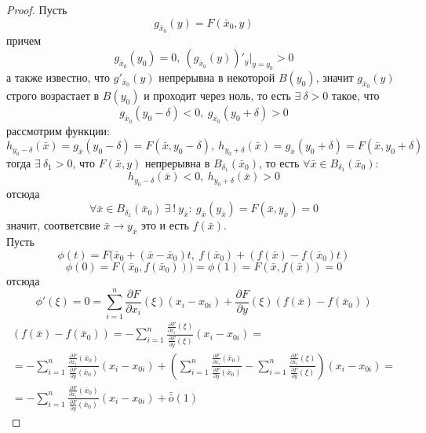 \begin{proof}
    Пусть 
    \[g_{\bar{x}_0}(y)=F(\bar{x}_0,y)\]
    причем
    \[g_{\bar{x}_0}(y_0)=0,\ (g_{\bar{x}_0}(y))'_y|_{y=y_0}>0\]
    а также известно, что $g'_{\bar{x}_0}(y)$ непрерывна в некоторой $B(y_0)$, значит $g_{\bar{x}_0}(y)$ строго возрастает в $B(y_0)$ и проходит через ноль, то есть $\exists\ \delta>0$ такое, что
    \[g_{\bar{x}_0}(y_0-\delta)<0,\ g_{\bar{x}_0}(y_0+\delta)>0\]
    рассмотрим функции:
    \[h_{y_0-\delta}(\bar{x})=g_{\bar{x}}(y_0-\delta)=F(\bar{x},y_0-\delta),\ h_{y_0+\delta}(\bar{x})=g_{\bar{x}}(y_0+\delta)=F(\bar{x}, y_0+\delta)\] 
    тогда $\exists\ \delta_1>0$, что $F(\bar{x}, y)$ непрерывна в $B_{\delta_1}(\bar{x}_0)$, то есть $\forall \bar{x}\in B_{\delta_1}(\bar{x}_0)$:
    \[h_{y_0-\delta}(\bar{x})<0,\ h_{y_0+\delta}(\bar{x})>0\]
    отсюда
    \[\forall \bar{x}\in B_{\delta_1}(\bar{x}_0)\ \exists\ !\ y_{\bar{x}}:\ g_{\bar{x}}(y_{\bar{x}})=F(\bar{x},y_{\bar{x}})=0\]
    значит, соответсвие $\bar{x}\to y_{\bar{x}}$ это и есть $f(\bar{x})$.\\
    Пусть 
    \[\phi(t)=F(\bar{x}_0+(\bar{x}-\bar{x}_0)t,\ f(\bar{x}_0)+(f(\bar{x})-f(\bar{x}_0)t)\]
    \[\phi(0)=F(\bar{x}_0, f(\bar{x}_0)))=\phi(1)=F(\bar{x}, f(\bar{x}))=0\]
    отсюда
    \[\phi'(\xi)=0=\sum\limits_{i=1}^{n}\frac{\partial {F}}{\partial {x_i}}(\xi)(x_i-x_{0i})+\frac{\partial {F}}{\partial {y}}(\xi)(f(\bar{x})-f(\bar{x}_0))\]
    \begin{multline*}
        (f(\bar{x})-f(\bar{x}_0))=-\sum\limits_{i=1}^{n}\frac{\frac{\partial {F}}{\partial {x_i}}(\xi)}{\frac{\partial {F}}{\partial {y}}(\xi)}(x_i-x_{0i})=\\
        =-\sum\limits_{i=1}^{n}\frac{\frac{\partial {F}}{\partial {x_i}}(\bar{x}_0)}{\frac{\partial {F}}{\partial {y}}(\bar{x}_0)}(x_i-x_{0i})+\left(\sum\limits_{i=1}^{n}\frac{\frac{\partial {F}}{\partial {x_i}}(\bar{x}_0)}{\frac{\partial {F}}{\partial {y}}(\bar{x}_0)}-\sum\limits_{i=1}^{n}\frac{\frac{\partial {F}}{\partial {x_i}}(\xi)}{\frac{\partial {F}}{\partial {y}}(\xi)}\right)(x_i-x_{0i})=\\
        =-\sum\limits_{i=1}^{n}\frac{\frac{\partial {F}}{\partial {x_i}}(\bar{x}_0)}{\frac{\partial {F}}{\partial {y}}(\bar{x}_0)}(x_i-x_{0i})+\bar{\bar{o}}{(1)}
    \end{multline*} 
\end{proof} 
